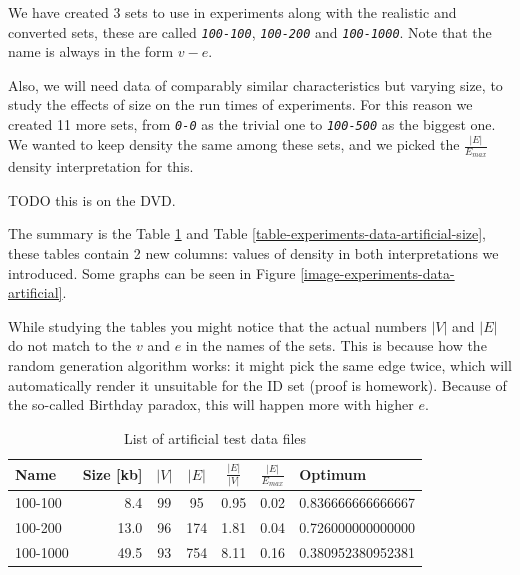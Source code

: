 \documentclass[a4paper,12pt,oneside]{report}
\newcommand{\jmodule}[1]{\texttt{\textit{#1}}}
\theoremstyle{definition}
\begin{document}
We have created 3 sets to use in experiments along with the realistic and converted sets, these are called \jmodule{100-100}, \jmodule{100-200} and \jmodule{100-1000}. Note that the name is always in the form $v-e$. 

Also, we will need data of comparably similar characteristics but varying size, to study the effects of size on the run times of experiments. For this reason we created 11 more sets, from \jmodule{0-0} as the trivial one to \jmodule{100-500} as the biggest one. We wanted to keep density the same among these sets, and we picked the $\frac{|E|}{E_{max}}$ density interpretation for this.

TODO this is on the DVD.

The summary is the Table \ref{table-experiments-data-artificial} and Table \ref{table-experiments-data-artificial-size}, these tables contain 2 new columns: values of density in both interpretations we introduced. Some graphs can be seen in Figure \ref{image-experiments-data-artificial}.

While studying the tables you might notice that the actual numbers $|V|$ and $|E|$ do not match to the $v$ and $e$ in the names of the sets. This is because how the random generation algorithm works: it might pick the same edge twice, which will automatically render it unsuitable for the ID set (proof is homework). %
Because of the so-called Birthday paradox, %
this will happen more with higher $e$.

\begin{table}
  \caption{List of artificial test data files}
  \bigskip
  \label{table-experiments-data-artificial}
  \centering
  \begin{tabular}{l | r | c | c | c | c | l}
	Name  & Size [kb] & $|V|$ & $|E|$ & $\frac{|E|}{|V|}$ & $\frac{|E|}{E_{max}}$ & Optimum \\
	\hline
	100-100  & 8.4  & 99 & 95  & 0.95 & 0.02 & 0.836666666666667 \\
	100-200  & 13.0 & 96 & 174 & 1.81 & 0.04 & 0.726000000000000 \\ 
    100-1000 & 49.5 & 93 & 754 & 8.11 & 0.16 & 0.380952380952381 \\ 
  \end{tabular}
\end{table}
\end{document}
